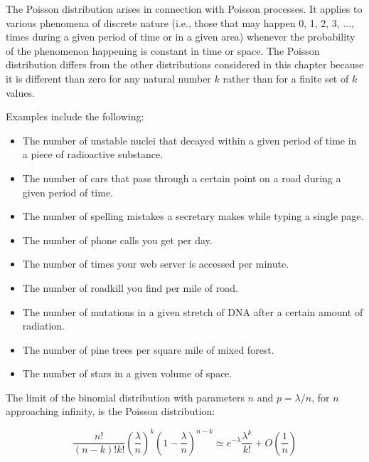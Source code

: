 \documentclass[justified, sixbynine]{tufte-book}
\theoremstyle{plain}%
\newtheorem * {corollary}{Corollary}
\theoremstyle{definition}
\theoremstyle{remark}
\newtheorem * {remark}{Remark}
\newtheorem * {note}{Note}
\begin{document}
\begin{fullwidth}
The Poisson distribution arises in connection with Poisson processes. It
applies to various phenomena of discrete nature (i.e., those that may
happen 0, 1, 2, 3, ..., times during a given period of time or in a given
area) whenever the probability of the phenomenon happening is constant in
time or space. The Poisson distribution differs from the other distributions
considered in this chapter because it is different than zero for any natural
number $k$ rather than for a finite set of $k$ values.

Examples include the following:

\begin{itemize}
\item  The number of unstable nuclei that decayed within a given period of
time in a piece of radioactive substance.

\item  The number of cars that pass through a certain point on a road during
a given period of time.

\item  The number of spelling mistakes a secretary makes while typing a
single page.

\item  The number of phone calls you get per day.

\item  The number of times your web server is accessed per minute.

\item  The number of roadkill you find per mile of road.

\item  The number of mutations in a given stretch of DNA after a certain
amount of radiation.

\item  The number of pine trees per square mile of mixed forest.

\item  The number of stars in a given volume of space.
\end{itemize}

The limit of the binomial distribution with parameters $n$ and $p=\lambda /n$, for $n$ approaching infinity, is the Poisson distribution:

\begin{equation}
\frac{n!}{(n-k)!k!}\left( \frac \lambda n\right) ^k\left( 1-\frac \lambda
n\right) ^{n-k}\simeq e^{-\lambda }\frac{\lambda ^k}{k!}+O(\frac 1n)
\end{equation}


\end{fullwidth}
\end{document}
